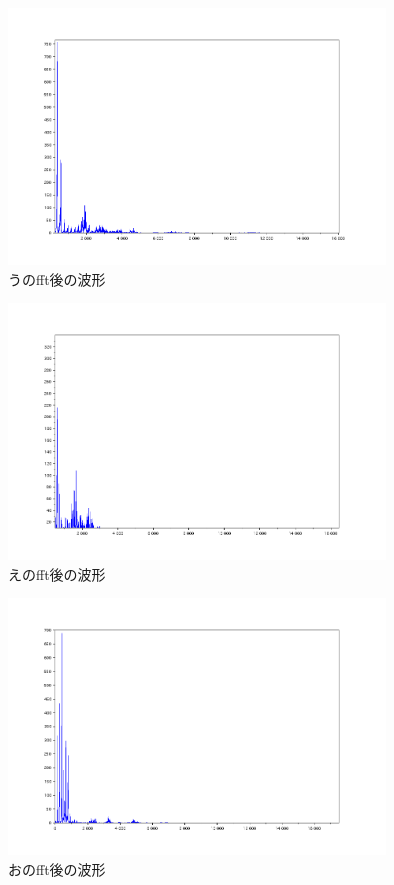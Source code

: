 \documentclass[12pt,oneside]{sotsuken_paper}
\begin{document}
\begin{figure}[htbp]
\begin{center}
\includegraphics[width=100mm]{img/u_fft.png}
\caption{うのfft後の波形}
\label{fig:u_fft}
\end{center}
\end{figure}


\begin{figure}[htbp]
\begin{center}
\includegraphics[width=100mm]{img/e_fft.png}
\caption{えのfft後の波形}
\label{fig:e_fft}
\end{center}
\end{figure}


\begin{figure}[htbp]
\begin{center}
\includegraphics[width=100mm]{img/o_fft.png}
\caption{おのfft後の波形}
\label{fig:o_fft}
\end{center}
\end{figure}
\end{document}
